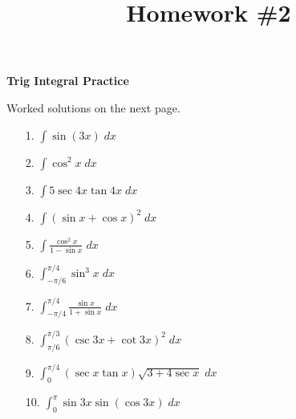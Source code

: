 \documentclass[11pt,reqno]{article}
\title{Homework \#2}
\theoremstyle{definition}
\begin{document}
	\centerline{\textbf{\Large{Trig Integral Practice}}}
	
	\vspace{0.2in}
	 Worked solutions on the next page.
	\begin{enumerate}
		\item[1.]  $\int \sin(3x) \; dx$
		\item[2.]  $\int \cos^2 x \; dx$
		\item[3.] $\int 5 \sec 4x  \tan 4x \; dx$
		\item[4.] $\int (\sin x + \cos x)^2 \; dx$
		\item[5.] $\int \frac{\cos^2 x}{1 - \sin x} \; dx$
		\item[6.] $\int_{-\pi/6}^{\pi/4} \sin^3 x \; dx$
		\item[7.] $\int_{-\pi/4}^{\pi/4} \frac{\sin x}{1 + \sin x} \; dx$
		\item[8.] $\int_{\pi/6}^{\pi/3} (\csc 3x + \cot 3x)^2 \; dx$
		\item[9.] $\int_{0}^{\pi/4} (\sec x \tan x) \sqrt{3 + 4 \sec x} \;dx$
		\item[10.] $\int_{0}^{\pi} \sin 3x \sin(\cos 3x) \; dx$
		
	
	\end{enumerate}
	
	
\end{document}
